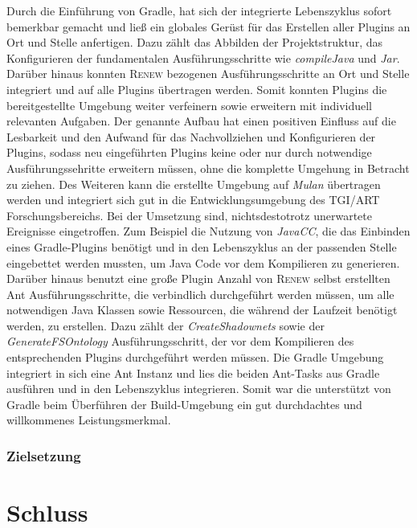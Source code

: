 Durch die Einführung von Gradle, hat sich der integrierte Lebenszyklus sofort bemerkbar gemacht und ließ ein globales Gerüst für das Erstellen aller Plugins an Ort und Stelle anfertigen. Dazu zählt das Abbilden der Projektstruktur, das Konfigurieren der fundamentalen Ausführungsschritte wie \textit{compileJava} und \textit{Jar}. Darüber hinaus konnten \textsc{Renew} bezogenen Ausführungsschritte an Ort und Stelle integriert und auf alle Plugins übertragen werden. Somit konnten Plugins die bereitgestellte Umgebung weiter verfeinern sowie erweitern mit individuell  relevanten Aufgaben. Der genannte Aufbau hat einen positiven Einfluss auf die Lesbarkeit und den Aufwand für das Nachvollziehen und Konfigurieren der Plugins, sodass neu eingeführten Plugins keine oder nur durch notwendige Ausführungssehritte erweitern müssen, ohne die komplette Umgehung in Betracht zu ziehen. Des Weiteren kann die erstellte Umgebung auf \textit{Mulan} übertragen werden und integriert sich gut in die Entwicklungsumgebung des TGI/ART Forschungsbereichs.\newline
Bei der Umsetzung sind, nichtsdestotrotz unerwartete Ereignisse eingetroffen. Zum Beispiel die Nutzung von \textit{JavaCC}, die das Einbinden eines Gradle-Plugins benötigt und in den Lebenszyklus an der passenden Stelle eingebettet werden mussten, um Java Code vor dem Kompilieren zu generieren. Darüber hinaus benutzt eine große Plugin Anzahl von \textsc{Renew} selbst erstellten Ant Ausführungsschritte, die verbindlich durchgeführt werden müssen, um alle notwendigen Java Klassen sowie Ressourcen, die während der Laufzeit benötigt werden, zu erstellen. Dazu zählt der \textit{CreateShadownets} sowie der \textit{GenerateFSOntology} Ausführungsschritt, der vor dem Kompilieren des entsprechenden Plugins durchgeführt werden müssen. Die Gradle Umgebung integriert in sich eine Ant Instanz und lies die beiden Ant-Tasks aus Gradle ausführen und in den Lebenszyklus integrieren. Somit war die unterstützt von Gradle beim Überführen der Build-Umgebung ein gut durchdachtes und willkommenes Leistungsmerkmal.

\subsection{Zielsetzung}

\chapter{Schluss}


